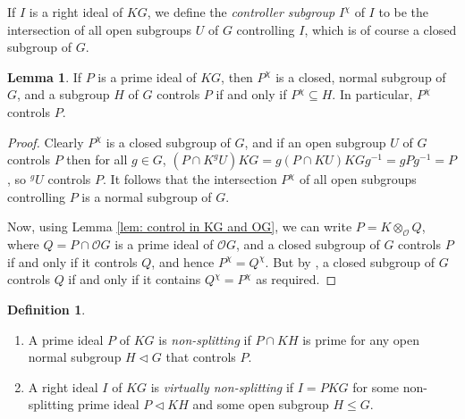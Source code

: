 \documentclass[12pt,a4paper]{article}
\theoremstyle{definition}
\newtheorem{lem}[thm]{Lemma}
\newtheorem{defn}[thm]{Definition}
\theoremstyle{remark}
\theoremstyle{custthm}
\renewcommand{\O}{\mathcal{O}}
\begin{document}
If $I$ is a right ideal of $K G$, we define the \emph{controller subgroup} $I^\chi$ of $I$ to be the intersection of all open subgroups $U$ of $G$ controlling $I$, which is of course a closed subgroup of $G$.

\begin{lem}\label{lem: controller subgroup}
If $P$ is a prime ideal of $KG$, then $P^\chi$ is a closed, normal subgroup of $G$, and a subgroup $H$ of $G$ controls $P$ if and only if $P^\chi\subseteq H$. In particular, $P^\chi$ controls $P$.
\end{lem}

\begin{proof}

Clearly $P^\chi$ is a closed subgroup of $G$, and if an open subgroup $U$ of $G$ controls $P$ then for all $g\in G$, $(P\cap K^gU)KG=g(P\cap KU)KGg^{-1}=gPg^{-1}=P$, so $^gU$ controls $P$. It follows that the intersection $P^\chi$ of all open subgroups controlling $P$ is a normal subgroup of $G$.

Now, using Lemma \ref{lem: control in KG and OG}, we can write $P=K\otimes_\O Q$, where $Q=P\cap\O G$ is a prime ideal of $\O G$, and a closed subgroup of $G$ controls $P$ if and only if it controls $Q$, and hence $P^\chi=Q^\chi$. But by \cite[Theorem A]{controller}, a closed subgroup of $G$ controls $Q$ if and only if it contains $Q^\chi=P^\chi$ as required.\end{proof}



\begin{defn}\label{defn: non-splitting right ideals} $ $

\begin{enumerate}[label=(\roman*)]
\item \cite[Definition 5.5]{ardakovInv} A prime ideal $P$ of $KG$ is \emph{non-splitting} if $P\cap KH$ is prime for any open normal subgroup $H\lhd G$ that controls $P$.
\item \cite[Definition 5.7]{ardakovInv} A right ideal $I$ of $KG$ is \emph{virtually non-splitting} if $I = PKG$ for some non-splitting prime ideal $P\lhd KH$ and some open subgroup $H \leq G$.
\end{enumerate}
\end{defn}
\end{document}
